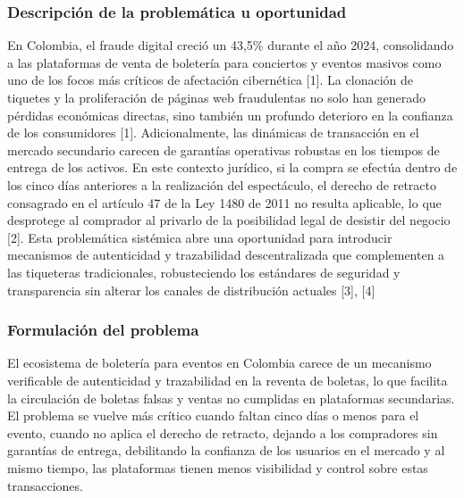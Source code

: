 \documentclass[12pt,a4paper]{article}
\begin{document}
\subsubsection{Descripción de la problemática u oportunidad}
En Colombia, el fraude digital creció un 43,5\% durante el año 2024, consolidando a las plataformas de venta de boletería para conciertos y eventos masivos como uno de los focos más críticos de afectación cibernética [1]. La clonación de tiquetes y la proliferación de páginas web fraudulentas no solo han generado pérdidas económicas directas, sino también un profundo deterioro en la confianza de los consumidores [1]. Adicionalmente, las dinámicas de transacción en el mercado secundario carecen de garantías operativas robustas en los tiempos de entrega de los activos. En este contexto jurídico, si la compra se efectúa dentro de los cinco días anteriores a la realización del espectáculo, el derecho de retracto consagrado en el artículo 47 de la Ley 1480 de 2011 no resulta aplicable, lo que desprotege al comprador al privarlo de la posibilidad legal de desistir del negocio [2]. Esta problemática sistémica abre una oportunidad para introducir mecanismos de autenticidad y trazabilidad descentralizada que complementen a las tiqueteras tradicionales, robusteciendo los estándares de seguridad y transparencia sin alterar los canales de distribución actuales [3], [4]
\subsubsection{Formulación del problema}
El ecosistema de boletería para eventos en Colombia carece de un mecanismo verificable de autenticidad y trazabilidad en la reventa de boletas, lo que facilita la circulación de boletas falsas y ventas no cumplidas en plataformas secundarias. El problema se vuelve más crítico cuando faltan cinco días o menos para el evento, cuando no aplica el derecho de retracto, dejando a los compradores sin garantías de entrega, debilitando la confianza de los usuarios en el mercado y al mismo tiempo, las plataformas tienen menos visibilidad y control sobre estas transacciones.
\end{document}
